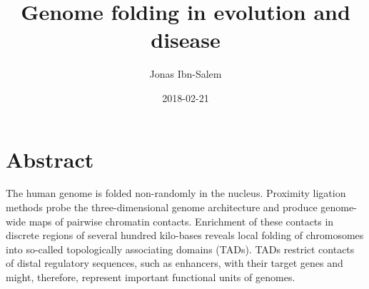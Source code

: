 \documentclass[a4paper,twoside=true,openright,parskip=full,chapterprefix=true,11pt,headings=normal,bibliography=totoc,listof=totoc,titlepage=on,captions=tableabove,draft=false]{scrreprt}
\title{Genome folding in evolution and disease}
\author{Jonas Ibn-Salem}
\date{2018-02-21}
\theoremstyle{definition}
\theoremstyle{definition}
\theoremstyle{definition}
\theoremstyle{remark}
\begin{document}




\pagestyle{empty}				%
\cleardoublepage

\pagestyle{plain}				%
\cleardoublepage
%
%

\setcounter{page}{1}			%
\pagestyle{maincontentstyle} 	%

{
\setcounter{tocdepth}{3}
\tableofcontents
}
\hypertarget{abstract}{%
\chapter*{Abstract}\label{abstract}}

The human genome is folded non-randomly in the nucleus. Proximity
ligation methods probe the three-dimensional genome architecture and
produce genome-wide maps of pairwise chromatin contacts. Enrichment of
these contacts in discrete regions of several hundred kilo-bases reveals
local folding of chromosomes into so-called topologically associating
domains (TADs). TADs restrict contacts of distal regulatory sequences,
such as enhancers, with their target genes and might, therefore,
represent important functional units of genomes.
\end{document}
